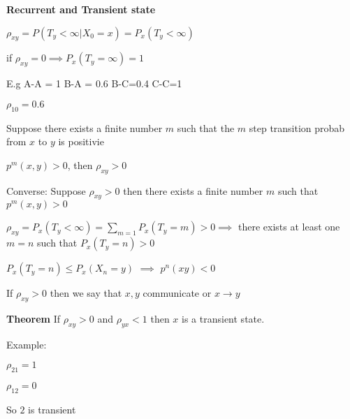 \documentclass{article}
\begin{document}
\textbf{Recurrent and Transient state}

$\rho_{xy}=  P(T_y < \infty | X_0=x) = P_x(T_y<\infty) $

if $\rho_{xy}=0 \implies P_x(T_y = \infty) = 1$

E.g A-A = 1
B-A = 0.6
B-C=0.4
C-C=1

$\rho_{10} = 0.6$

Suppose there exists a finite number $m$ such that the $m$ step 
transition probab from $x$ to $y$ is positivie

$p^m(x,y) > 0 $, then $\rho_{xy} >0$


Converse: Suppose $\rho_{xy} > 0$ then there exists a finite number $
m$ such that $p^m(x,y) > 0$

$\rho_{xy} = P_x(T_y < \infty) = \sum_{m=1}P_x(T_y=m) > 0 \implies $ there exists at least one $m=n$ such that $P_x(T_y=n) > 0$ 

$P_x(T_y=n) \leq P_x(X_n=y)$ $\implies$  $p^n(xy) < 0$

If $\rho_{xy} > 0$ then we say that $x,y$ communicate or $x \longrightarrow y$


\textbf{Theorem} If $\rho_{xy} > 0$ and $\rho_{yx} < 1$ then $x$ is a transient state.

Example: 

$\rho_{21} = 1$

$\rho_{12}  = 0$

So $2$ is transient
\end{document}
